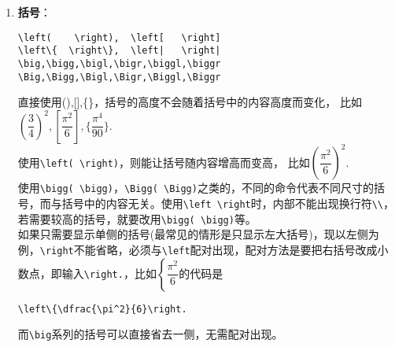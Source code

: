 \documentclass{article}
\newcommand{\q}{\quad}
\begin{document}
\begin{multicols}{2}
\begin{enumerate}
              虽然\verb|\usepackage{bigints}|后可以用命令
              \begin{lstlisting}
\bigintssss,\bigintsss,\bigintss,
\bigints,   \bigint    
\end{lstlisting}
              获得不同大小的积分号(而无需\verb|\displaystyle|)，
              但这个系列的积分号太粗了，不美观。\\
              比如\verb|\bigintss|：$ \bigintss_{0}^{+\infty} \sin(x^2){\rm d}x
                  =\dfrac{\sqrt{2\pi}}{4} $.\\
              \\
              \textbf{多重极限}：\\
              $ \lim\limits_{x\to x_0 \atop y\to y_0} $\q
              \verb|\lim\limits_{x\to x_0 \atop y\to y_0}| \\
              $ \lim\limits_{\substack{w\to w_0\\ x\to x_0\\ y\to y_0\\ z\to z_0}} $
              \begin{lstlisting}
\lim\limits_{\substack{w\to w_0\\ 
     x\to x_0\\ y\to y_0\\ z\to z_0}}    
\end{lstlisting}

        \item \textbf{括号}：
              \begin{lstlisting}
\left(    \right),  \left[   \right]
\left\{  \right\},  \left|   \right|
\big,\bigg,\bigl,\bigr,\biggl,\biggr 
\Big,\Bigg,\Bigl,\Bigr,\Biggl,\Biggr
\end{lstlisting}
              直接使用(),[],\{\}，括号的高度不会随着括号中的内容高度而变化，
              比如$ (\dfrac{3}{4})^2,[\dfrac{\pi^2}{6}],\{\dfrac{\pi^4}{90}\} $.\\
              使用\verb|\left( \right)|，则能让括号随内容增高而变高，
              比如$ \left(\dfrac{\pi^2}{6}\right)^2 $. \\
              使用\verb|\bigg( \bigg)|，\verb|\Bigg( \Bigg)|之类的，不同的命令代表不同尺寸的括号，而与括号中的内容无关。使用\verb|\left \right|时，内部不能出现换行符\verb|\\|，
              若需要较高的括号，就要改用\verb|\bigg( \bigg)|等。\\
              如果只需要显示单侧的括号(最常见的情形是只显示左大括号)，现以左侧为例，\verb|\right|不能省略，必须与\verb|\left|配对出现，配对方法是要把右括号改成小数点，即输入\verb|\right.|，比如$ \left\{\dfrac{\pi^2}{6}\right. $的代码是
              \begin{lstlisting}
\left\{\dfrac{\pi^2}{6}\right.    
\end{lstlisting}
              而\verb|\big|系列的括号可以直接省去一侧，无需配对出现。


\end{enumerate}
\end{multicols}
\end{document}
